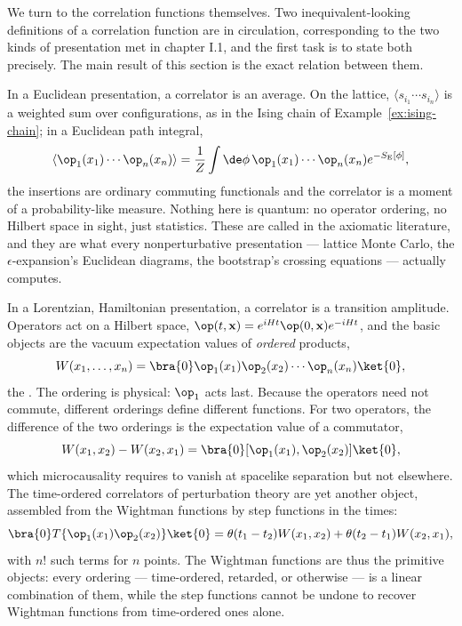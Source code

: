 We turn to the correlation functions themselves. Two inequivalent-looking
definitions of a correlation function are in circulation, corresponding to
the two kinds of presentation met in chapter I.1, and the first task is to
state both precisely. The main result of this section is the exact relation
between them.

In a Euclidean presentation, a correlator is an average. On the lattice,
$\langle s_{i_1} \cdots s_{i_n} \rangle$ is a weighted sum over configurations,
as in the Ising chain of Example~\ref{ex:ising-chain}; in a Euclidean path
integral,
\begin{equation}
\langle \op_1(x_1) \cdots \op_n(x_n) \rangle
= \frac{1}{Z}\int \de\phi\, \op_1(x_1) \cdots \op_n(x_n) e^{-S_{\rm E}[\phi]},
\label{eq:euclidean-correlator}
\end{equation}
the insertions are ordinary commuting functionals and the correlator is a
moment of a probability-like measure. Nothing here is quantum: no operator
ordering, no Hilbert space in sight, just statistics. These are called
 in the axiomatic literature, and they are what
every nonperturbative presentation --- lattice Monte Carlo, the
$\epsilon$-expansion's Euclidean diagrams, the bootstrap's crossing equations
--- actually computes.

In a Lorentzian, Hamiltonian presentation, a correlator is a transition
amplitude. Operators act on a Hilbert space, $\op(t,\mathbf{x}) = e^{iHt}
\op(0,\mathbf{x}) e^{-iHt}$, and the basic objects are the vacuum expectation
values of \emph{ordered} products,
\begin{equation}
W(x_1, \dots, x_n) = \bra{0} \op_1(x_1) \op_2(x_2) \cdots \op_n(x_n) \ket{0},
\label{eq:wightman-def}
\end{equation}
the . The ordering is physical: $\op_1$ acts last.
Because the operators need not commute, different orderings define
different functions. For two operators, the difference of the two orderings
is the expectation value of a commutator,
\begin{equation}
W(x_1, x_2) - W(x_2, x_1)
= \bra{0}[\op_1(x_1), \op_2(x_2)]\ket{0},
\label{eq:ordering-difference}
\end{equation}
which microcausality requires to vanish at spacelike separation but not
elsewhere. The time-ordered correlators of perturbation theory are yet
another object, assembled from the Wightman functions by step functions in
the times:
\begin{equation}
\bra{0} T\{\op_1(x_1)\op_2(x_2)\}\ket{0}
= \theta(t_1 - t_2) W(x_1, x_2) + \theta(t_2 - t_1) W(x_2, x_1),
\label{eq:time-ordering}
\end{equation}
with $n!$ such terms for $n$ points. The Wightman functions are thus the
primitive objects: every ordering --- time-ordered, retarded, or otherwise
--- is a linear combination of them, while the step functions cannot be
undone to recover Wightman functions from time-ordered ones alone.

